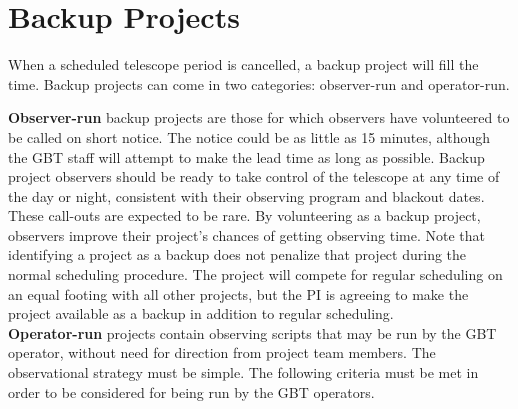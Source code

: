 \chapter{Backup Projects}\label{appendix:backupprojects}

When a scheduled telescope period is cancelled, a backup project will fill the time.
Backup projects can come in two categories: observer-run and operator-run.

\noindent
{\bf Observer-run} backup projects are those for which observers have volunteered to be called
on short notice. The notice could be as little as 15 minutes, although the GBT staff will
attempt to make the lead time as long as possible. Backup project observers should be
ready to take control of the telescope at any time of the day or night, consistent with their
observing program and blackout dates. These call-outs are expected to be rare. By
volunteering as a backup project, observers improve their project's chances of getting
observing time. Note that identifying a project as a backup does not penalize that project
during the normal scheduling procedure. The project will compete for regular scheduling
on an equal footing with all other projects, but the PI is agreeing to make the project
available as a backup in addition to regular scheduling.\\

\noindent
{\bf Operator-run}\label{sec:operatorrun} projects contain observing scripts that may be run
by the GBT operator, without need for direction from project team members. The observational
strategy must be simple. The following criteria must be met in order to be considered for
being run by the GBT operators.

